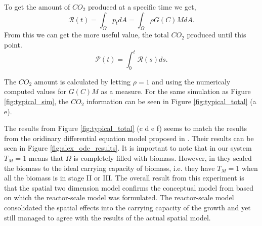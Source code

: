 To get the amount of $CO_2$ produced at a specific time we get,
\begin{equation}
  \mathcal{R}(t) = \int_\Omega p_t dA = \int_\Omega \rho G(C) M dA.
\end{equation}
From this we can get the more useful value, the total $CO_2$ produced until this point.
\begin{equation}
  \mathcal{P}(t) = \int^t_0 \mathcal{R}(s) ds.
\end{equation}

The $CO_2$ amount is calculated by letting $\rho = 1$ and using the numericaly computed values for $G(C)M$ as a measure.
For the same simulation as Figure \ref{fig:typical_sim}, the $CO_2$ information can be seen in Figure \ref{fig:typical_total} (a e).

The results from Figure \ref{fig:typical_total} (c d e f) seems to match the results from the oridinary differential equation model proposed in \cite{dumitrache2014understanding}.
Their results can be seen in Figure \ref{fig:alex_ode_results}.
It is important to note that in our system $T_M = 1 $ means that $\Omega$ is completely filled with biomass.
However, in \cite{dumitrache2015mathematicalModeling} they scaled the biomass to the ideal carrying capacity of biomass, i.e. they have $T_M = 1$ when all the biomass is in stage II or III.
The overall result from this experiment is that the spatial two dimension model confirms the conceptual model from \cite{dumitrache2015mathematicalModeling} based on which the reactor-scale model was formulated.
The reactor-scale model consolidated the spatial effects into the carrying capacity of the growth and yet still managed to agree with the results of the actual spatial model.

